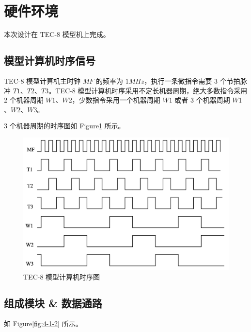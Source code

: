 \documentclass[12pt]{article}
\begin{document}
{\section{硬件环境}
    本次设计在 TEC-8 模型机上完成。
    \subsection{模型计算机时序信号}
        TEC-8 模型计算机主时钟 $MF$ 的频率为 $1MHz$，执行一条微指令需要 $3$ 个节拍脉冲 $T1$、$T2$、$T3$。TEC-8 模型计算机时序采用不定长机器周期，绝大多数指令采用 $2$ 个机器周期 $W1$、$W2$，少数指令采用一个机器周期 $W1$ 或者 $3$ 个机器周期 $W1$、$W2$、$W3$。
        
        $3$ 个机器周期的时序图如 Figure\ref{fig:4-1-1} 所示。
        
        \begin{figure}[!ht]
            \centering
            \includegraphics[width=1.0\textwidth]{时序图.png}
            \caption{TEC-8 模型计算机时序图}
            \label{fig:4-1-1}
        \end{figure}
        
    \subsection{组成模块 \& 数据通路}
        如 Figure\ref{fig:4-1-2} 所示。
        
}
\end{document}
